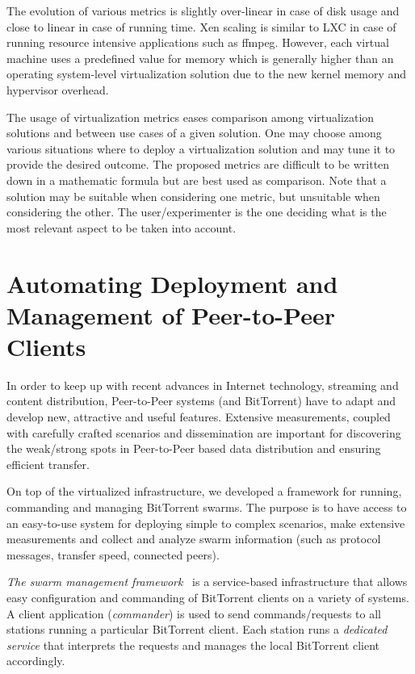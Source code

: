The evolution of various metrics is slightly over-linear in case of disk usage
and close to linear in case of running time. Xen scaling is similar to LXC in
case of running resource intensive applications such as ffmpeg. However, each
virtual machine uses a predefined value for memory which is generally higher
than an operating system-level virtualization solution due to the new kernel
memory and hypervisor overhead.

The usage of virtualization metrics eases comparison among virtualization
solutions and between use cases of a given solution. One may choose among
various situations where to deploy a virtualization solution and may tune it
to provide the desired outcome. The proposed metrics are difficult to be
written down in a mathematic formula but are best used as comparison. Note
that a solution may be suitable when considering one metric, but unsuitable
when considering the other. The user/experimenter is the one deciding what is
the most relevant aspect to be taken into account.

\section{Automating Deployment and Management of Peer-to-Peer Clients}
\label{sec:virt-infra:auto-deploy}

In order to keep up with recent advances in Internet technology, streaming and
content distribution, Peer-to-Peer systems (and BitTorrent) have to adapt and
develop new, attractive and useful features. Extensive measurements, coupled
with carefully crafted scenarios and dissemination are important for
discovering the weak/strong spots in Peer-to-Peer based data distribution and
ensuring efficient transfer.

On top of the virtualized infrastructure, we developed a framework for
running, commanding and managing BitTorrent swarms. The purpose is to have
access to an easy-to-use system for deploying simple to complex scenarios, make
extensive measurements and collect and analyze swarm information (such as
protocol messages, transfer speed, connected peers).

\textit{The swarm management framework}~\cite{swarm-management} is a service-based infrastructure that
allows easy configuration and commanding of BitTorrent clients on a variety of
systems. A client application (\textit{commander}) is used to send
commands/requests to all stations running a particular BitTorrent client. Each
station runs a \textit{dedicated service} that interprets the requests and
manages the local BitTorrent client accordingly.


